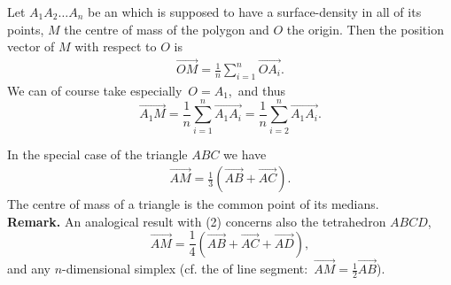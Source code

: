 \documentclass[12pt]{article}
\theoremstyle{definition}
\begin{document}
Let $A_1A_2{\ldots}A_n$ be an  which is supposed to have a  surface-density in all of its points, $M$ the centre of mass of the polygon and $O$ the origin.  Then the position vector of $M$ with respect to $O$ is
\begin{align}
\overrightarrow{OM} = \frac{1}{n}\sum_{i=1}^n\overrightarrow{OA_i}.
\end{align}
We can of course take especially\, $O = A_1$,\, and thus
$$\overrightarrow{A_1M} = \frac{1}{n}\sum_{i=1}^n\overrightarrow{A_1A_i} =  
\frac{1}{n}\sum_{i=2}^n\overrightarrow{A_1A_i}.$$

In the special case of the triangle $ABC$ we have
\begin{align}
\overrightarrow{AM} = \frac{1}{3}(\overrightarrow{AB}+\overrightarrow{AC}).
\end{align}
The centre of mass of a triangle is the common point of its medians.\\

\textbf{Remark.}  An analogical result with (2) concerns also the  tetrahedron $ABCD$,
$$\overrightarrow{AM} = \frac{1}{4}(\overrightarrow{AB}+\overrightarrow{AC}+\overrightarrow{AD}),$$
and any $n$-dimensional simplex (cf. the  of line segment:\, $\overrightarrow{AM} = \frac{1}{2}\overrightarrow{AB}$).

\end{document}
